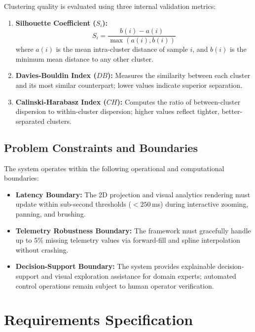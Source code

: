 \documentclass[12pt,a4paper]{report}
\begin{document}
Clustering quality is evaluated using three internal validation metrics:
\begin{enumerate}
    \item \textbf{Silhouette Coefficient ($S_i$):}
    \begin{equation}
        S_i = \frac{b(i) - a(i)}{\max(a(i), b(i))}
    \end{equation}
    where $a(i)$ is the mean intra-cluster distance of sample $i$, and $b(i)$ is the minimum mean distance to any other cluster.
    \item \textbf{Davies-Bouldin Index ($DB$):} Measures the similarity between each cluster and its most similar counterpart; lower values indicate superior separation.
    \item \textbf{Calinski-Harabasz Index ($CH$):} Computes the ratio of between-cluster dispersion to within-cluster dispersion; higher values reflect tighter, better-separated clusters.
\end{enumerate}

\section{Problem Constraints and Boundaries}
The system operates within the following operational and computational boundaries:
\begin{itemize}
    \item \textbf{Latency Boundary:} The 2D projection and visual analytics rendering must update within sub-second thresholds ($<250$\,ms) during interactive zooming, panning, and brushing.
    \item \textbf{Telemetry Robustness Boundary:} The framework must gracefully handle up to 5\% missing telemetry values via forward-fill and spline interpolation without crashing.
    \item \textbf{Decision-Support Boundary:} The system provides explainable decision-support and visual exploration assistance for domain experts; automated control operations remain subject to human operator verification.
\end{itemize}


\chapter{Requirements Specification}
\end{document}
